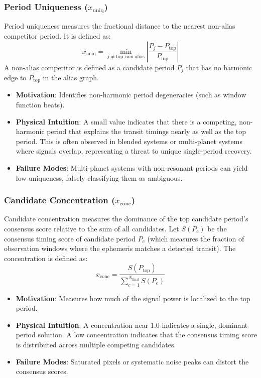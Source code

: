 \subsubsection{Period Uniqueness ($x_{\text{uniq}}$)}
Period uniqueness measures the fractional distance to the nearest non-alias competitor period. It is defined as:
\begin{equation}
x_{\text{uniq}} = \min_{j \ne \text{top}, \text{non-alias}} \left| \frac{P_j - P_{\text{top}}}{P_{\text{top}}} \right|
\label{eq:uniq}
\end{equation}
A non-alias competitor is defined as a candidate period $P_j$ that has no harmonic edge to $P_{\text{top}}$ in the alias graph.
\begin{itemize}
\item \textbf{Motivation}: Identifies non-harmonic period degeneracies (such as window function beats).
\item \textbf{Physical Intuition}: A small value indicates that there is a competing, non-harmonic period that explains the transit timings nearly as well as the top period. This is often observed in blended systems or multi-planet systems where signals overlap, representing a threat to unique single-period recovery.
\item \textbf{Failure Modes}: Multi-planet systems with non-resonant periods can yield low uniqueness, falsely classifying them as ambiguous.
\end{itemize}

\subsubsection{Candidate Concentration ($x_{\text{conc}}$)}
Candidate concentration measures the dominance of the top candidate period's consensus score relative to the sum of all candidates. Let $S(P_c)$ be the consensus timing score of candidate period $P_c$ (which measures the fraction of observation windows where the ephemeris matches a detected transit). The concentration is defined as:
\begin{equation}
x_{\text{conc}} = \frac{S(P_{\text{top}})}{\sum_{c=1}^{N_{\text{final}}} S(P_c)}
\label{eq:conc}
\end{equation}
\begin{itemize}
\item \textbf{Motivation}: Measures how much of the signal power is localized to the top period.
\item \textbf{Physical Intuition}: A concentration near $1.0$ indicates a single, dominant period solution. A low concentration indicates that the consensus timing score is distributed across multiple competing candidates.
\item \textbf{Failure Modes}: Saturated pixels or systematic noise peaks can distort the consensus scores.
\end{itemize}

